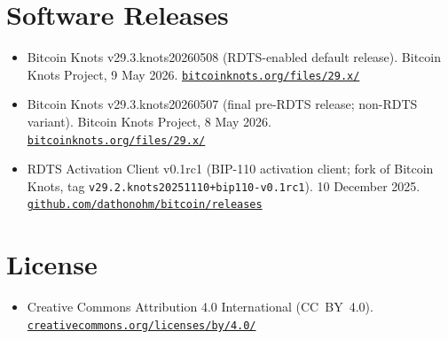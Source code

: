 \documentclass[11pt, twoside, openright]{book}
\begin{document}
\section*{Software Releases}
\begin{itemize}[leftmargin=1.5em, itemsep=4pt]
  \item Bitcoin Knots v29.3.knots20260508 (RDTS-enabled default release). Bitcoin Knots Project, 9 May 2026. \href{https://bitcoinknots.org/files/29.x/}{\nolinkurl{bitcoinknots.org/files/29.x/}}
  \item Bitcoin Knots v29.3.knots20260507 (final pre-RDTS release; non-RDTS variant). Bitcoin Knots Project, 8 May 2026. \href{https://bitcoinknots.org/files/29.x/}{\nolinkurl{bitcoinknots.org/files/29.x/}}
  \item RDTS Activation Client v0.1rc1 (BIP-110 activation client; fork of Bitcoin Knots, tag \texttt{v29.2.knots20251110+bip110-v0.1rc1}). 10 December 2025. \href{https://github.com/dathonohm/bitcoin/releases}{\nolinkurl{github.com/dathonohm/bitcoin/releases}}
\end{itemize}

\section*{License}
\begin{itemize}[leftmargin=1.5em, itemsep=4pt]
  \item Creative Commons Attribution 4.0 International (CC~BY~4.0). \href{https://creativecommons.org/licenses/by/4.0/}{\nolinkurl{creativecommons.org/licenses/by/4.0/}}
\end{itemize}
\end{document}
